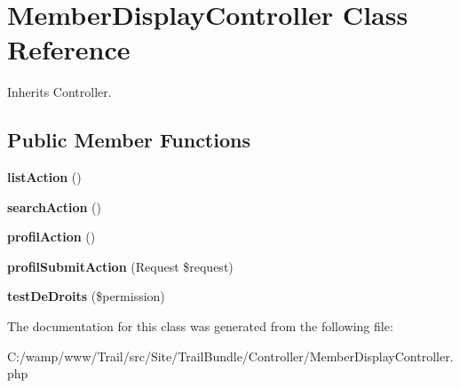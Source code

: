 \hypertarget{class_site_1_1_trail_bundle_1_1_controller_1_1_member_display_controller}{}\section{Member\+Display\+Controller Class Reference}
\label{class_site_1_1_trail_bundle_1_1_controller_1_1_member_display_controller}


Inherits Controller.

\subsection*{Public Member Functions}
\begin{DoxyCompactItemize}
\item 
\hypertarget{class_site_1_1_trail_bundle_1_1_controller_1_1_member_display_controller_a6eda2bd1ea1df0b02479c67431c50ddb}{}{\bfseries list\+Action} ()\label{class_site_1_1_trail_bundle_1_1_controller_1_1_member_display_controller_a6eda2bd1ea1df0b02479c67431c50ddb}

\item 
\hypertarget{class_site_1_1_trail_bundle_1_1_controller_1_1_member_display_controller_aa1fa79f63fc3b3767918370816735cf0}{}{\bfseries search\+Action} ()\label{class_site_1_1_trail_bundle_1_1_controller_1_1_member_display_controller_aa1fa79f63fc3b3767918370816735cf0}

\item 
\hypertarget{class_site_1_1_trail_bundle_1_1_controller_1_1_member_display_controller_ae75b1e4cad7ffec117d8a1b27901c0db}{}{\bfseries profil\+Action} ()\label{class_site_1_1_trail_bundle_1_1_controller_1_1_member_display_controller_ae75b1e4cad7ffec117d8a1b27901c0db}

\item 
\hypertarget{class_site_1_1_trail_bundle_1_1_controller_1_1_member_display_controller_a0cd6278615683a53703f74c5f5b66f3c}{}{\bfseries profil\+Submit\+Action} (Request \$request)\label{class_site_1_1_trail_bundle_1_1_controller_1_1_member_display_controller_a0cd6278615683a53703f74c5f5b66f3c}

\item 
\hypertarget{class_site_1_1_trail_bundle_1_1_controller_1_1_member_display_controller_a49387e8719305355ba3fae06b0b9bc2a}{}{\bfseries test\+De\+Droits} (\$permission)\label{class_site_1_1_trail_bundle_1_1_controller_1_1_member_display_controller_a49387e8719305355ba3fae06b0b9bc2a}

\end{DoxyCompactItemize}


The documentation for this class was generated from the following file\+:\begin{DoxyCompactItemize}
\item 
C\+:/wamp/www/\+Trail/src/\+Site/\+Trail\+Bundle/\+Controller/Member\+Display\+Controller.\+php\end{DoxyCompactItemize}
